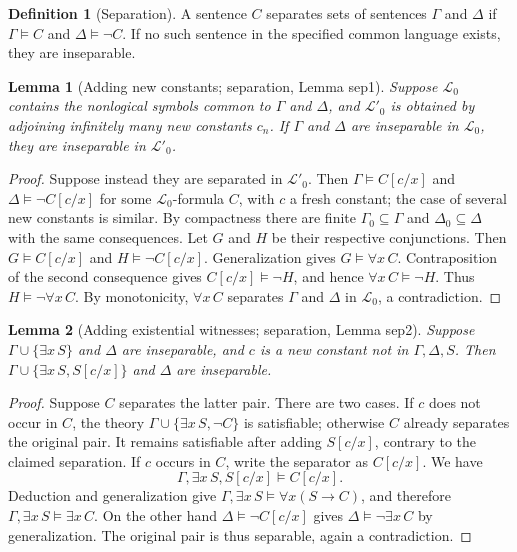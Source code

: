 \documentclass[UTF8,11pt]{ctexart}
\newtheorem*{lemma}{Lemma}
\theoremstyle{definition}
\newtheorem*{definition}{Definition}
\begin{document}
\begin{definition}[Separation]
A sentence $C$ separates sets of sentences $\Gamma$ and $\Delta$ if
$\Gamma\models C$ and $\Delta\models\neg C$. If no such sentence
in the specified common language exists, they are inseparable.
\end{definition}
\begin{lemma}[Adding new constants; separation, Lemma sep1]
Suppose $\mathcal L_0$ contains the nonlogical symbols common to $\Gamma$
and $\Delta$, and $\mathcal L'_0$ is obtained by adjoining infinitely many
new constants $c_n$. If $\Gamma$ and $\Delta$ are inseparable in
$\mathcal L_0$, they are inseparable in $\mathcal L'_0$.
\end{lemma}
\begin{proof}
Suppose instead they are separated in $\mathcal L'_0$.
Then $\Gamma\models C[c/x]$ and $\Delta\models\neg C[c/x]$ for some
$\mathcal L_0$-formula $C$, with $c$ a fresh constant; the case of several
new constants is similar. By compactness there are finite
$\Gamma_0\subseteq\Gamma$ and $\Delta_0\subseteq\Delta$ with the same
consequences. Let $G$ and $H$ be their respective conjunctions. Then
$G\models C[c/x]$ and $H\models\neg C[c/x]$.
Generalization gives $G\models\forall x\,C$. Contraposition of the second
consequence gives $C[c/x]\models\neg H$, and hence
$\forall x\,C\models\neg H$. Thus $H\models\neg\forall x\,C$.
By monotonicity, $\forall x\,C$ separates $\Gamma$ and $\Delta$
in $\mathcal L_0$, a contradiction.
\end{proof}
\begin{lemma}[Adding existential witnesses; separation, Lemma sep2]
Suppose $\Gamma\cup\{\exists x\,S\}$ and $\Delta$ are inseparable, and
$c$ is a new constant not in $\Gamma,\Delta,S$.
Then $\Gamma\cup\{\exists x\,S,S[c/x]\}$ and $\Delta$ are inseparable.
\end{lemma}
\begin{proof}
Suppose $C$ separates the latter pair. There are two cases.
If $c$ does not occur in $C$, the theory
$\Gamma\cup\{\exists x\,S,\neg C\}$ is satisfiable; otherwise $C$
already separates the original pair. It remains satisfiable after
adding $S[c/x]$, contrary to the claimed separation.
If $c$ occurs in $C$, write the separator as $C[c/x]$. We have
\[
\Gamma,\exists x\,S,S[c/x]\models C[c/x].
\]
Deduction and generalization give
$\Gamma,\exists x\,S\models\forall x(S\to C)$, and therefore
$\Gamma,\exists x\,S\models\exists x\,C$.
On the other hand $\Delta\models\neg C[c/x]$ gives
$\Delta\models\neg\exists x\,C$ by generalization.
The original pair is thus separable, again a contradiction.
\end{proof}
\end{document}

